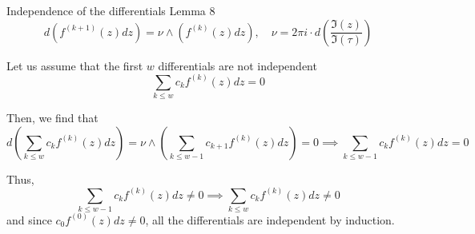 \documentclass[11pt,aspectratio=169]{beamer}
\begin{document}
\begin{frame}{Independence of the differentials}{\tiny \cite{BL13} Lemma 8}
    \[d(f^{(k+1)}(z)dz) = \nu \wedge (f^{(k)}(z)dz), \quad \nu = 2\pi i \cdot d\left(\frac{\Im(z)}{\Im(\tau)}\right)\]

    \pause{}

    Let us assume that the first $w$ differentials are not independent
    \[\sum_{k\leq w} c_{k} f^{(k)}(z) dz = 0\]

    \pause{}

    Then, we find that
    \[ d\left(\sum_{k\leq w} c_{k} f^{(k)}(z) dz\right) = \nu \wedge \left(\sum_{k\leq w-1} c_{k+1} f^{(k)}(z) dz\right) = 0 \implies \sum_{k\leq w-1} c_{k} f^{(k)}(z) dz = 0 \]

    \pause{}

    Thus,
    \[\sum_{k\leq w-1} c_{k} f^{(k)}(z) dz \neq 0 \implies \sum_{k\leq w} c_{k} f^{(k)}(z) dz \neq 0\]
    and since $c_0 f^{(0)}(z) dz \neq 0$, all the differentials are independent by induction.
\end{frame}
\end{document}
